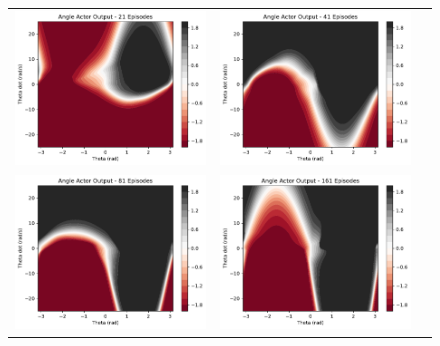 \begin{figure}
	\begin{tabular}{ccc}
		\includegraphics[width=65mm]{figures/train_figs/angle_actor/Actor0_21.pdf} &  
		\includegraphics[width=65mm]{figures/train_figs/angle_actor/Actor0_41.pdf} \\
		\includegraphics[width=65mm]{figures/train_figs/angle_actor/Actor0_81.pdf} &   \includegraphics[width=65mm]{figures/train_figs/angle_actor/Actor0_161.pdf} \\

\end{tabular}
\end{figure}
